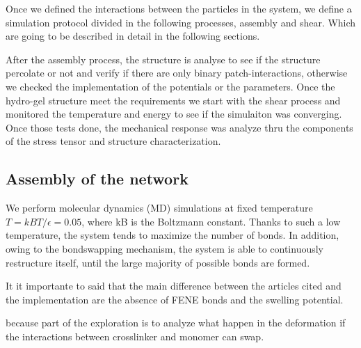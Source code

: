 \documentclass[../main.tex]{subfiles}
\begin{document}
Once we defined the interactions between the particles in the system, we define a simulation protocol divided in the following processes, assembly and shear.
Which are going to be described in detail in the following sections.


After the assembly process, the structure is analyse to see if the structure percolate or not and verify if there are only binary patch-interactions, otherwise we checked the implementation of the potentials or the parameters.
Once the hydro-gel structure meet the requirements we start with the shear process and monitored the temperature and energy to see if the simulaiton was converging.
Once those tests done, the mechanical response was analyze thru the components of the stress tensor and structure characterization.

\subsection{Assembly of the network}

We perform molecular dynamics (MD) simulations at fixed temperature $T = kBT/\epsilon = 0.05$, where kB is the Boltzmann constant. 
Thanks to such a low temperature, the system tends to maximize the number of bonds. 
In addition, owing to the bondswapping mechanism, the system is able to continuously restructure itself, until the large majority of possible bonds are formed.

It it importante to said that the main difference between the articles cited and the implementation are the absence of FENE bonds and the swelling potential.

because part of the exploration is to analyze what happen in the deformation if the interactions between crosslinker and monomer can swap.
\end{document}
